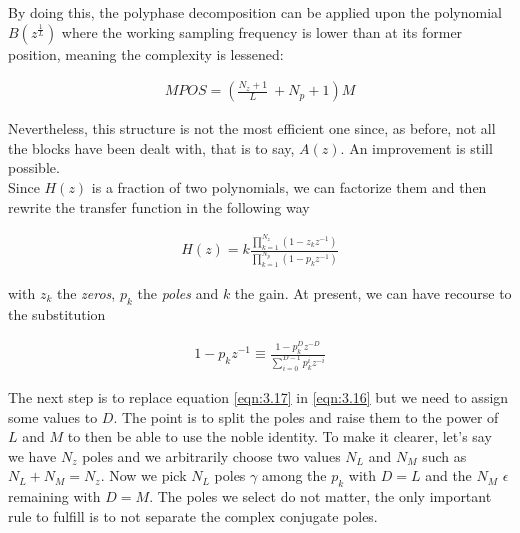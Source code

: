 By doing this, the polyphase decomposition can be applied upon the polynomial $B(z^{\frac{1}{L}})$ where the working sampling frequency is lower than at its former position, meaning the complexity is lessened:

%

\begin{align}
	MPOS = (\frac{N_z+1}{L}\ + N_p + 1)M\label{eqn:3.15}
\end{align}

Nevertheless, this structure is not the most efficient one since, as before, not all the blocks have been dealt with, that is to say, $A(z)$. An improvement is still possible.\\

Since $H(z)$ is a fraction of two polynomials, we can factorize them and then rewrite the transfer function in the following way

\begin{align}
	H(z) = k\frac{\prod\limits_{k=1}^{N_z} (1 - z_k z^{-1} )}{\prod\limits_{k=1}^{N_p} (1 - p_k z^{-1})}
	\label{eqn:3.16}
\end{align}

with $z_k$ the \textit{zeros}, $p_k$ the \textit{poles} and $k$ the gain. At present, we can have recourse to the substitution 

\begin{align}
	1 - p_kz^{-1} \equiv \frac{1 - p_k^Dz^{-D}}{\sum\limits_{i=0}^{D-1}p_k^iz^{-i}}
	\label{eqn:3.17}
\end{align} 


The next step is to replace equation \ref{eqn:3.17} in \ref{eqn:3.16} but we need to assign some values to $D$. The point is to split the poles and raise them to the power of $L$ and $M$ to then be able to use the noble identity. To make it clearer, let's say we have $N_z$ poles and we arbitrarily choose two values $N_L$ and $N_M$ such as $N_L + N_M = N_z$. Now we pick $N_L$ poles $\gamma$ among the $p_k$ with $D = L$ and the $N_M$ $\epsilon$ remaining with $D = M$. The poles we select do not matter, the only important rule to fulfill is to not separate the complex conjugate poles. 

